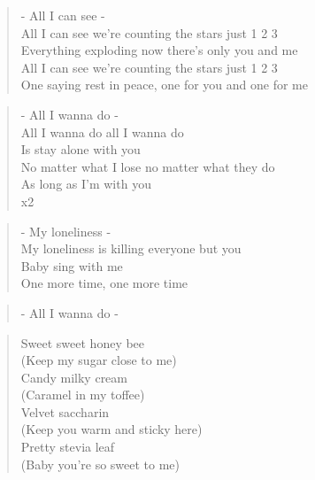 \begin{verse}
- All I can see -\\
All I can see we're counting the stars just 1 2 3\\
Everything exploding now there's only you and me\\
All I can see we're counting the stars just 1 2 3\\
One saying rest in peace, one for you and one for me
\end{verse}

\begin{verse}
- All I wanna do -\\
All I wanna do all I wanna do \\
Is stay alone with you\\
No matter what I lose no matter what they do \\
As long as I'm with you\\
x2
\end{verse}

\begin{verse}
- My loneliness -\\
My loneliness is killing everyone but you\\
Baby sing with me \\
One more time, one more time
\end{verse}

\begin{verse}
- All I wanna do - 
\end{verse}

\begin{verse}
Sweet sweet honey bee \\
(Keep my sugar close to me)\\
Candy milky cream \\
(Caramel in my toffee)\\
Velvet saccharin \\
(Keep you warm and sticky here)\\
Pretty stevia leaf \\
(Baby you're so sweet to me)
\end{verse}

\clearpage

